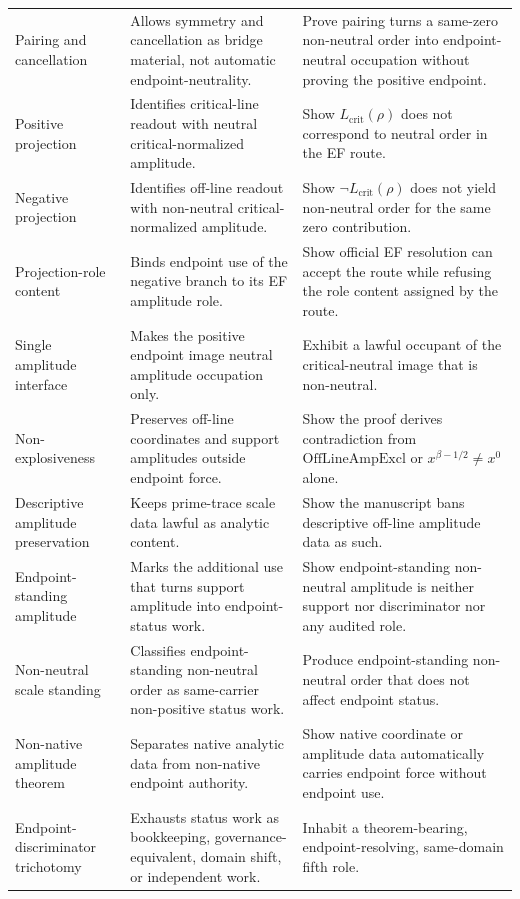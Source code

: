 \documentclass[11pt]{article}
\newcommand{\Lcrit}{L_{\mathrm{crit}}}
\newcommand{\OffAmpExcl}{\mathrm{OffLineAmpExcl}}
\begin{document}
\begin{longtable}{L{0.21\textwidth}L{0.31\textwidth}L{0.37\textwidth}}
Pairing and cancellation & Allows symmetry and cancellation as bridge material, not automatic endpoint-neutrality. & Prove pairing turns a same-zero non-neutral order into endpoint-neutral occupation without proving the positive endpoint.\\
Positive projection & Identifies critical-line readout with neutral critical-normalized amplitude. & Show \(\Lcrit(\rho)\) does not correspond to neutral order in the EF route.\\
Negative projection & Identifies off-line readout with non-neutral critical-normalized amplitude. & Show \(\neg\Lcrit(\rho)\) does not yield non-neutral order for the same zero contribution.\\
Projection-role content & Binds endpoint use of the negative branch to its EF amplitude role. & Show official EF resolution can accept the route while refusing the role content assigned by the route.\\
Single amplitude interface & Makes the positive endpoint image neutral amplitude occupation only. & Exhibit a lawful occupant of the critical-neutral image that is non-neutral.\\
Non-explosiveness & Preserves off-line coordinates and support amplitudes outside endpoint force. & Show the proof derives contradiction from \(\OffAmpExcl\) or \(x^{\beta-1/2}\ne x^0\) alone.\\
Descriptive amplitude preservation & Keeps prime-trace scale data lawful as analytic content. & Show the manuscript bans descriptive off-line amplitude data as such.\\
Endpoint-standing amplitude & Marks the additional use that turns support amplitude into endpoint-status work. & Show endpoint-standing non-neutral amplitude is neither support nor discriminator nor any audited role.\\
Non-neutral scale standing & Classifies endpoint-standing non-neutral order as same-carrier non-positive status work. & Produce endpoint-standing non-neutral order that does not affect endpoint status.\\
Non-native amplitude theorem & Separates native analytic data from non-native endpoint authority. & Show native coordinate or amplitude data automatically carries endpoint force without endpoint use.\\
Endpoint-discriminator trichotomy & Exhausts status work as bookkeeping, governance-equivalent, domain shift, or independent work. & Inhabit a theorem-bearing, endpoint-resolving, same-domain fifth role.\\

\end{longtable}
\end{document}
